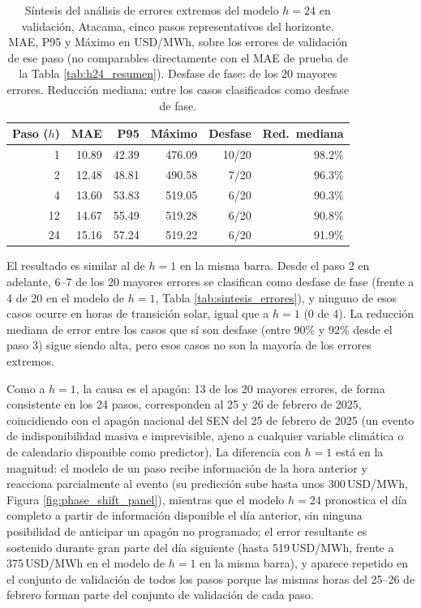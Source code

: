 \begin{table}[htbp]
    \centering
    \small
    \begin{tabular}{rrrrrr}
        \toprule
        Paso ($h$) & MAE & P95 & Máximo & Desfase & Red.\ mediana \\
        \midrule
        1  & 10.89 & 42.39 & 476.09 & 10/20 & 98.2\% \\
        2  & 12.48 & 48.81 & 490.58 &  7/20 & 96.3\% \\
        4  & 13.60 & 53.83 & 519.05 &  6/20 & 90.3\% \\
        12 & 14.67 & 55.49 & 519.28 &  6/20 & 90.8\% \\
        24 & 15.16 & 57.24 & 519.22 &  6/20 & 91.9\% \\
        \bottomrule
    \end{tabular}
    \vspace{0.2cm}
    \caption{Síntesis del análisis de errores extremos del modelo $h=24$ en validación, Atacama, cinco pasos representativos del horizonte. MAE, P95 y Máximo en USD/MWh, sobre los errores de validación de ese paso (no comparables directamente con el MAE de prueba de la Tabla \ref{tab:h24_resumen}). Desfase de fase: de los 20 mayores errores. Reducción mediana: entre los casos clasificados como desfase de fase.}
    \label{tab:h24_errores_extremos}
\end{table}

El resultado es similar al de $h=1$ en la misma barra. Desde el paso 2 en adelante, 6--7 de los 20 mayores errores se clasifican como desfase de fase (frente a 4 de 20 en el modelo de $h=1$, Tabla \ref{tab:sintesis_errores}), y ninguno de esos casos ocurre en horas de transición solar, igual que a $h=1$ (0 de 4). La reducción mediana de error entre los casos que sí son desfase (entre 90\% y 92\% desde el paso 3) sigue siendo alta, pero esos casos no son la mayoría de los errores extremos.

Como a $h=1$, la causa es el apagón: 13 de los 20 mayores errores, de forma consistente en los 24 pasos, corresponden al 25 y 26 de febrero de 2025, coincidiendo con el apagón nacional del SEN del 25 de febrero de 2025 (un evento de indisponibilidad masiva e imprevisible, ajeno a cualquier variable climática o de calendario disponible como predictor). La diferencia con $h=1$ está en la magnitud: el modelo de un paso recibe información de la hora anterior y reacciona parcialmente al evento (su predicción sube hasta unos 300\,USD/MWh, Figura \ref{fig:phase_shift_panel}), mientras que el modelo $h=24$ pronostica el día completo a partir de información disponible el día anterior, sin ninguna posibilidad de anticipar un apagón no programado; el error resultante es sostenido durante gran parte del día siguiente (hasta 519\,USD/MWh, frente a 375\,USD/MWh en el modelo de $h=1$ en la misma barra), y aparece repetido en el conjunto de validación de todos los pasos porque las mismas horas del 25--26 de febrero forman parte del conjunto de validación de cada paso.


